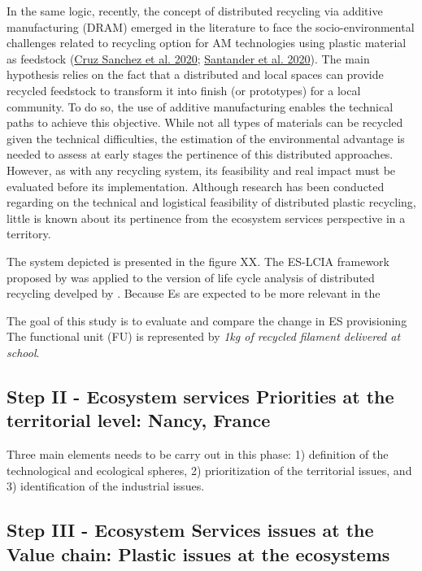 \documentclass[
]{article}
\begin{document}
In the same logic, recently, the concept of distributed recycling via additive manufacturing (DRAM) emerged in the literature to face the socio-environmental challenges related to recycling option for AM technologies using plastic material as feedstock (\protect\hyperlink{ref-CruzSanchez2020}{Cruz Sanchez et al. 2020}; \protect\hyperlink{ref-Santander2020}{Santander et al. 2020}).
The main hypothesis relies on the fact that a distributed and local spaces can provide recycled feedstock to transform it into finish (or prototypes) for a local community.
To do so, the use of additive manufacturing enables the technical paths to achieve this objective.
While not all types of materials can be recycled given the technical difficulties, the estimation of the environmental advantage is needed to assess at early stages the pertinence of this distributed approaches.
However, as with any recycling system, its feasibility and real impact must be evaluated before its implementation.
Although research has been conducted regarding on the technical and logistical feasibility of distributed plastic recycling, little is known about its pertinence from the ecosystem services perspective in a territory.

The system depicted is presented in the figure XX.
The ES-LCIA framework proposed by was applied to the version of life cycle analysis of distributed recycling develped by .
Because Es are expected to be more relevant in the

The goal of this study is to evaluate and compare the change in ES provisioning
The functional unit (FU) is represented by \emph{1kg of recycled filament delivered at school}.

\hypertarget{step-ii---ecosystem-services-priorities-at-the-territorial-level-nancy-france}{%
\subsection{Step II - Ecosystem services Priorities at the territorial level: Nancy, France}\label{step-ii---ecosystem-services-priorities-at-the-territorial-level-nancy-france}}

Three main elements needs to be carry out in this phase: 1) definition of the technological and ecological spheres, 2) prioritization of the territorial issues, and 3) identification of the industrial issues.

\hypertarget{step-iii---ecosystem-services-issues-at-the-value-chain-plastic-issues-at-the-ecosystems}{%
\subsection{Step III - Ecosystem Services issues at the Value chain: Plastic issues at the ecosystems}\label{step-iii---ecosystem-services-issues-at-the-value-chain-plastic-issues-at-the-ecosystems}}
\end{document}
